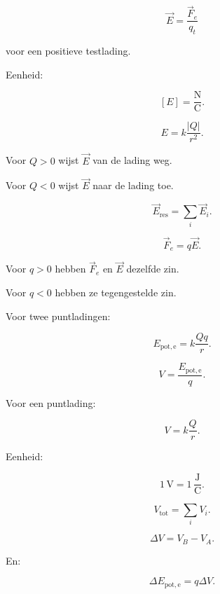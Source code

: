\documentclass{ximera}
\begin{document}




\[
\boxed{
\vec E
=
\frac{\vec F_e}{q_t}
}
\]

voor een positieve testlading.

Eenheid:

\[
\boxed{
[E]=\mathrm{\frac NC}.
}
\]



\[
\boxed{
E
=
k\frac{|Q|}{r^2}.
}
\]

Voor $Q>0$ wijst $\vec E$ van de lading weg.

Voor $Q<0$ wijst $\vec E$ naar de lading toe.



\[
\boxed{
\vec E_\mathrm{res}
=
\sum_i\vec E_i.
}
\]



\[
\boxed{
\vec F_e=q\vec E.
}
\]

Voor $q>0$ hebben $\vec F_e$ en $\vec E$ dezelfde zin.

Voor $q<0$ hebben ze tegengestelde zin.



Voor twee puntladingen:

\[
\boxed{
E_{\mathrm{pot,e}}
=
k\frac{Qq}{r}.
}
\]



\[
\boxed{
V
=
\frac{E_{\mathrm{pot,e}}}{q}.
}
\]

Voor een puntlading:

\[
\boxed{
V
=
k\frac{Q}{r}.
}
\]

Eenheid:

\[
\boxed{
1\,\mathrm V
=
1\,\mathrm{\frac JC}.
}
\]



\[
\boxed{
V_\mathrm{tot}
=
\sum_iV_i.
}
\]



\[
\boxed{
\Delta V=V_B-V_A.
}
\]

En:

\[
\boxed{
\Delta E_{\mathrm{pot,e}}
=
q\Delta V.
}
\]


\end{document}
